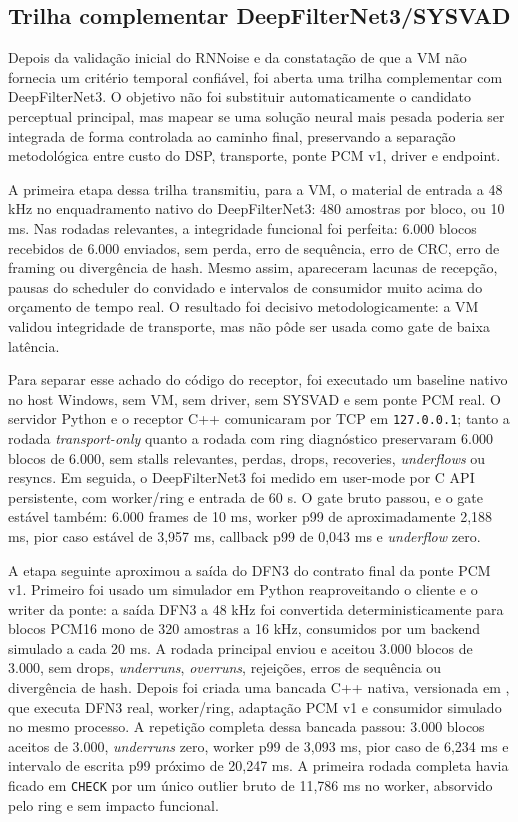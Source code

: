 \subsection{Trilha complementar DeepFilterNet3/SYSVAD}

Depois da validação inicial do RNNoise e da constatação de que a VM não fornecia um critério temporal confiável, foi aberta uma trilha complementar com DeepFilterNet3. O objetivo não foi substituir automaticamente o candidato perceptual principal, mas mapear se uma solução neural mais pesada poderia ser integrada de forma controlada ao caminho final, preservando a separação metodológica entre custo do DSP, transporte, ponte PCM v1, driver e endpoint.

A primeira etapa dessa trilha transmitiu, para a VM, o material de entrada a 48 kHz no enquadramento nativo do DeepFilterNet3: 480 amostras por bloco, ou 10 ms. Nas rodadas relevantes, a integridade funcional foi perfeita: 6.000 blocos recebidos de 6.000 enviados, sem perda, erro de sequência, erro de CRC, erro de framing ou divergência de hash. Mesmo assim, apareceram lacunas de recepção, pausas do scheduler do convidado e intervalos de consumidor muito acima do orçamento de tempo real. O resultado foi decisivo metodologicamente: a VM validou integridade de transporte, mas não pôde ser usada como gate de baixa latência.

Para separar esse achado do código do receptor, foi executado um baseline nativo no host Windows, sem VM, sem driver, sem SYSVAD e sem ponte PCM real. O servidor Python e o receptor C++ comunicaram por TCP em \texttt{127.0.0.1}; tanto a rodada \textit{transport-only} quanto a rodada com ring diagnóstico preservaram 6.000 blocos de 6.000, sem stalls relevantes, perdas, drops, recoveries, \textit{underflows} ou resyncs. Em seguida, o DeepFilterNet3 foi medido em user-mode por C API persistente, com worker/ring e entrada de 60 s. O gate bruto passou, e o gate estável também: 6.000 frames de 10 ms, worker p99 de aproximadamente 2,188 ms, pior caso estável de 3,957 ms, callback p99 de 0,043 ms e \textit{underflow} zero.

A etapa seguinte aproximou a saída do DFN3 do contrato final da ponte PCM v1. Primeiro foi usado um simulador em Python reaproveitando o cliente e o writer da ponte: a saída DFN3 a 48 kHz foi convertida deterministicamente para blocos PCM16 mono de 320 amostras a 16 kHz, consumidos por um backend simulado a cada 20 ms. A rodada principal enviou e aceitou 3.000 blocos de 3.000, sem drops, \textit{underruns}, \textit{overruns}, rejeições, erros de sequência ou divergência de hash. Depois foi criada uma bancada C++ nativa, versionada em , que executa DFN3 real, worker/ring, adaptação PCM v1 e consumidor simulado no mesmo processo. A repetição completa dessa bancada passou: 3.000 blocos aceitos de 3.000, \textit{underruns} zero, worker p99 de 3,093 ms, pior caso de 6,234 ms e intervalo de escrita p99 próximo de 20,247 ms. A primeira rodada completa havia ficado em \texttt{CHECK} por um único outlier bruto de 11,786 ms no worker, absorvido pelo ring e sem impacto funcional.

